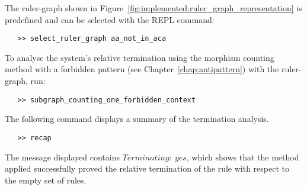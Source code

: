 The ruler-graph shown in Figure~\ref{fig:implemented:ruler_graph_representation} is predefined and can be selected with the REPL command:
 \begin{verbatim}
   >> select_ruler_graph aa_not_in_aca
 \end{verbatim}
To analyse the system's relative termination using the morphism counting method with a forbidden pattern (see Chapter~\ref{chap:antipattern}) with the ruler-graph, run:
 \begin{verbatim}
   >> subgraph_counting_one_forbidden_context
\end{verbatim}
The following command displays a summary of the termination analysis.
 \begin{verbatim}
   >> recap
\end{verbatim} 
The message displayed contains \colorbox{Ivory2}{$Terminating:\ yes$}, which shows that the method applied successfully proved the relative termination of the rule with respect to the empty set of rules.

